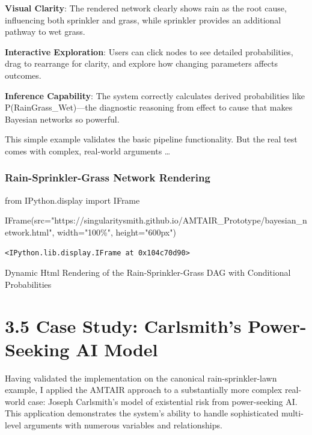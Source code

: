\documentclass[
  11pt,
  letterpaper,
]{book}
\newenvironment{Shaded}{\begin{snugshade}}{\end{snugshade}}
\newcommand{\ImportTok}[1]{\textcolor[rgb]{0.00,0.46,0.62}{#1}}
\newcommand{\NormalTok}[1]{\textcolor[rgb]{0.00,0.23,0.31}{#1}}
\newcommand{\OperatorTok}[1]{\textcolor[rgb]{0.37,0.37,0.37}{#1}}
\newcommand{\StringTok}[1]{\textcolor[rgb]{0.13,0.47,0.30}{#1}}
\begin{document}
\begin{landscape}
\textbf{Visual Clarity}: The rendered network clearly shows rain as the
root cause, influencing both sprinkler and grass, while sprinkler
provides an additional pathway to wet grass.

\textbf{Interactive Exploration}: Users can click nodes to see detailed
probabilities, drag to rearrange for clarity, and explore how changing
parameters affects outcomes.

\textbf{Inference Capability}: The system correctly calculates derived
probabilities like P(Rain\textbar Grass\_Wet)---the diagnostic reasoning
from effect to cause that makes Bayesian networks so powerful.

This simple example validates the basic pipeline functionality. But the
real test comes with complex, real-world arguments \ldots{}

\subsubsection{Rain-Sprinkler-Grass Network
Rendering}\label{rain-sprinkler-grass-network-rendering-1}

\begin{Shaded}
\begin{Highlighting}[]
\ImportTok{from}\NormalTok{ IPython.display }\ImportTok{import}\NormalTok{ IFrame}

\NormalTok{IFrame(src}\OperatorTok{=}\StringTok{"https://singularitysmith.github.io/AMTAIR\_Prototype/bayesian\_network.html"}\NormalTok{, width}\OperatorTok{=}\StringTok{"100\%"}\NormalTok{, height}\OperatorTok{=}\StringTok{"600px"}\NormalTok{)}
\end{Highlighting}
\end{Shaded}

\label{rain_sprinkler_grass_example_network_rendering2}
\begin{verbatim}
<IPython.lib.display.IFrame at 0x104c70d90>
\end{verbatim}

Dynamic Html Rendering of the Rain-Sprinkler-Grass DAG with Conditional
Probabilities

\end{landscape}

\section{3.5 Case Study: Carlsmith's Power-Seeking AI
Model}\label{sec-case-carlsmith}

Having validated the implementation on the canonical rain-sprinkler-lawn
example, I applied the AMTAIR approach to a substantially more complex
real-world case: Joseph Carlsmith's model of existential risk from
power-seeking AI. This application demonstrates the system's ability to
handle sophisticated multi-level arguments with numerous variables and
relationships.
\end{document}
